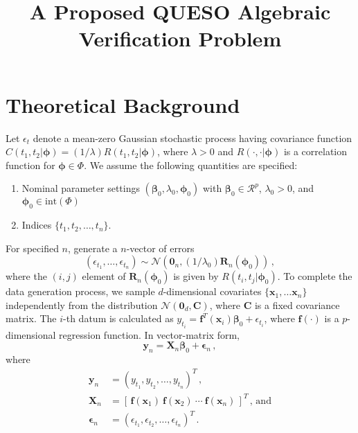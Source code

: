 \documentclass[11pt, oneside]{article}   	%
\title{A Proposed QUESO Algebraic Verification Problem}
\begin{document}
\maketitle

\section{Theoretical Background}
Let $\epsilon_t$ denote a mean-zero Gaussian stochastic process having covariance function $C(t_1, t_2 | \mathbf{\phi}) = (1/\lambda) R(t_1, t_2 | \mathbf{\phi})$, where $\lambda > 0$ and $R(\cdot, \cdot | \mathbf{\phi})$ is a correlation function for $\mathbf{\phi} \in \Phi$.  We assume the following quantities are specified:
\begin{enumerate}
\item Nominal parameter settings $(\mathbf{\beta}_0, \lambda_0, \mathbf{\phi}_0)$ with $\mathbf{\beta}_0 \in \mathcal{R}^p$, $\lambda_0 > 0$, and $\mathbf{\phi}_0 \in \mbox{int}(\Phi)$
\item Indices $\{ t_1, t_2, \ldots, t_n \}$.
\end{enumerate} 
For specified $n$, generate a $n$-vector of errors
\[
(\epsilon_{t_1}, \ldots, \epsilon_{t_n}) \sim \mathcal{N} \left(\mathbf{0}_n, (1/\lambda_0) \mathbf{R}_n (\mathbf{\phi}_0) \right) \,,
\]
where the $(i,j)$ element of $\mathbf{R}_n (\mathbf{\phi}_0)$ is given by $R(t_i, t_j | \mathbf{\phi}_0)$.  To complete the data generation process, we sample $d$-dimensional covariates $\{ \mathbf{x}_1, \ldots \mathbf{x}_n \}$ independently from the distribution $\mathcal{N}( \mathbf{0}_d, \mathbf{C})$, where $\mathbf{C}$ is a fixed covariance matrix.  The $i$-th datum is calculated as $y_{t_i} = \mathbf{f}^T(\mathbf{x}_i) \mathbf{\beta}_0 + \epsilon_{t_i}$, where $\mathbf{f}(\cdot)$ is a $p$-dimensional regression function.  In vector-matrix form,
\[
\mathbf{y}_n = \mathbf{X}_n \mathbf{\beta}_0 + \mathbf{\epsilon}_n \,,
\]
where
\begin{align*}
\mathbf{y}_n &= (y_{t_1}, y_{t_2}, \ldots, y_{t_n})^T \,, \\
\mathbf{X}_n &= [ \, \mathbf{f}(\mathbf{x}_1) ~ \mathbf{f}(\mathbf{x}_2) ~ \cdots ~ \mathbf{f}(\mathbf{x}_n) \, ]^T \,,\,\mbox{and} \\
\mathbf{\epsilon}_n &= (\epsilon_{t_1}, \epsilon_{t_2}, \ldots, \epsilon_{t_n})^T \,.
\end{align*}
\end{document}
